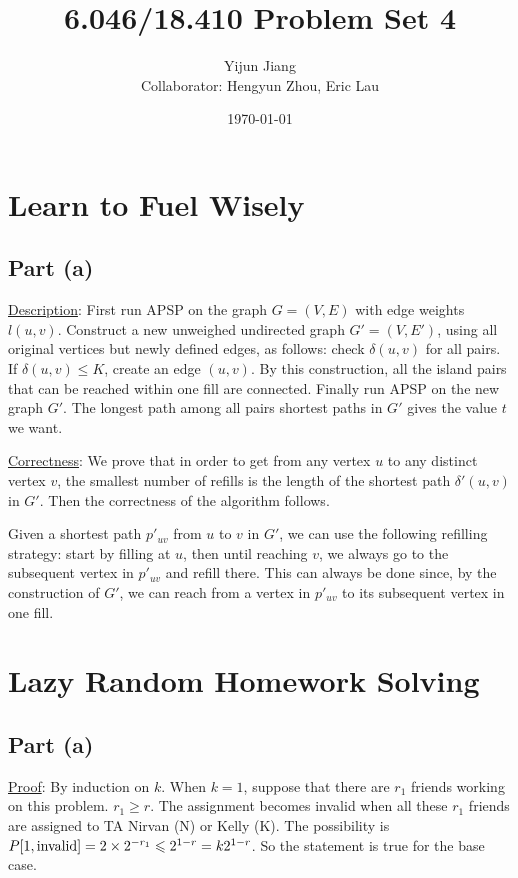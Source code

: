 \documentclass{article}
\title{6.046/18.410 Problem Set 4}
\author{Yijun Jiang\\Collaborator: Hengyun Zhou, Eric Lau}
\date{\today}
\begin{document}
\maketitle
\section{Learn to Fuel Wisely}
\subsection{Part (a)}
\noindent\underline{Description}: First run APSP on the graph $G=(V,E)$ with edge weights $l(u,v)$. Construct a new unweighed undirected graph $G'=(V,E')$, using all original vertices but newly defined edges, as follows: check $\delta(u,v)$ for all pairs. If $\delta(u,v)\leqslant K$, create an edge $(u,v)$. By this construction, all the island pairs that can be reached within one fill are connected. Finally run APSP on the new graph $G'$. The longest path among all pairs shortest paths in $G'$ gives the value $t$ we want.

\noindent\underline{Correctness}: We prove that in order to get from any vertex $u$ to any distinct vertex $v$, the smallest number of refills is the length of the shortest path $\delta'(u,v)$ in $G'$. Then the correctness of the algorithm follows.

Given a shortest path $p'_{uv}$ from $u$ to $v$ in $G'$, we can use the following refilling strategy: start by filling at $u$, then until reaching $v$, we always go to the subsequent vertex in $p'_{uv}$ and refill there. This can always be done since, by the construction of $G'$, we can reach from a vertex in $p'_{uv}$ to its subsequent vertex in one fill.

\section{Lazy Random Homework Solving}
\subsection{Part (a)}
\noindent\underline{Proof}: By induction on $k$. When $k=1$, suppose that there are $r_1$ friends working on this problem. $r_1\geqslant r$. The assignment becomes invalid when all these $r_1$ friends are assigned to TA Nirvan (N) or Kelly (K). The possibility is $P[1,\textup{invalid}]=2\times2^{-r_1}\leqslant 2^{1-r}=k2^{1-r}$. So the statement is true for the base case.
\end{document}

